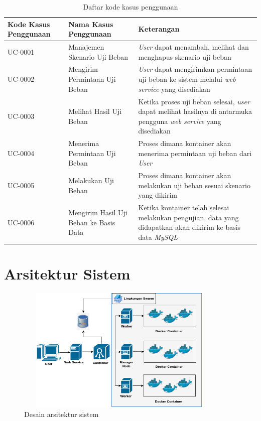     	\begin{longtable}{|p{}|p{}|p{}|}
    		\caption{Daftar kode kasus penggunaan} \label{tabelusecase} \\
    		\hline
    		\textbf{Kode Kasus Penggunaan} & \textbf{Nama Kasus Penggunaan} & \textbf{Keterangan} \\ \hline
    		\endhead
    		\endfoot
    		\endlastfoot
    		UC-0001 & Manajemen Skenario Uji Beban & \textit{User} dapat menambah, melihat dan menghapus skenario uji beban \\ \hline
    		UC-0002 & Mengirim Permintaan Uji Beban & \textit{User} dapat mengirimkan permintaan uji beban ke sistem melalui \textit{web service} yang disediakan \\ \hline
    		UC-0003 & Melihat Hasil Uji Beban & Ketika proses uji beban selesai, \textit{user} dapat melihat hasilnya di antarmuka pengguna \textit{web service} yang disediakan \\ \hline
    		UC-0004 & Menerima Permintaan Uji Beban & Proses dimana kontainer akan menerima permintaan uji beban dari \textit{User} \\ \hline
    		UC-0005 & Melakukan Uji Beban & Proses dimana kontainer akan melakukan uji beban sesuai skenario yang dikirim \\ \hline
    		UC-0006 & Mengirim Hasil Uji Beban ke Basis Data & Ketika kontainer telah selesai melakukan pengujian, data yang didapatkan akan dikirim ke basis data \textit{MySQL} \\ \hline
    	\end{longtable}
    
    \section{Arsitektur Sistem}
	    \begin{figure}[H]
	    	\centering
	    	\includegraphics[width=10cm,height=6cm]{Images/C-3/arsitektursistem.png}
	    	\caption{Desain arsitektur sistem}
	    	\label{arsitekturumum}
	    \end{figure}
    	
